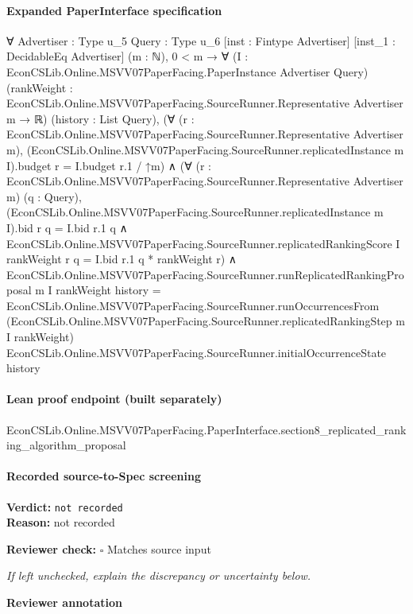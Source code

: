 \documentclass[10pt]{article}
\newcommand{\reviewerbox}{%
  \par\noindent\fbox{\parbox{0.96\linewidth}{\rule{0pt}{0.38in}}}\par
}
\newcommand{\reviewmatch}[1]{%
  \par\noindent\textbf{Reviewer check:} $\square$\; #1\par
  \noindent\emph{If left unchecked, explain the discrepancy or uncertainty below.}\par
}
\begin{document}
\paragraph{Expanded PaperInterface specification}
\begin{ReviewVerbatim}
∀ {Advertiser : Type u_5} {Query : Type u_6} [inst : Fintype Advertiser] [inst_1 : DecidableEq Advertiser] (m : ℕ),
  0 < m →
    ∀ (I : EconCSLib.Online.MSVV07PaperFacing.PaperInstance Advertiser Query)
      (rankWeight : EconCSLib.Online.MSVV07PaperFacing.SourceRunner.Representative Advertiser m → ℝ)
      (history : List Query),
      (∀ (r : EconCSLib.Online.MSVV07PaperFacing.SourceRunner.Representative Advertiser m),
          (EconCSLib.Online.MSVV07PaperFacing.SourceRunner.replicatedInstance m I).budget r = I.budget r.1 / ↑m) ∧
        (∀ (r : EconCSLib.Online.MSVV07PaperFacing.SourceRunner.Representative Advertiser m) (q : Query),
            (EconCSLib.Online.MSVV07PaperFacing.SourceRunner.replicatedInstance m I).bid r q = I.bid r.1 q ∧
              EconCSLib.Online.MSVV07PaperFacing.SourceRunner.replicatedRankingScore I rankWeight r q =
                I.bid r.1 q * rankWeight r) ∧
          EconCSLib.Online.MSVV07PaperFacing.SourceRunner.runReplicatedRankingProposal m I rankWeight history =
            EconCSLib.Online.MSVV07PaperFacing.SourceRunner.runOccurrencesFrom
              (EconCSLib.Online.MSVV07PaperFacing.SourceRunner.replicatedRankingStep m I rankWeight)
              EconCSLib.Online.MSVV07PaperFacing.SourceRunner.initialOccurrenceState history
\end{ReviewVerbatim}

\paragraph{Lean proof endpoint (built separately)}\begin{ReviewVerbatim}
EconCSLib.Online.MSVV07PaperFacing.PaperInterface.section8_replicated_ranking_algorithm_proposal
\end{ReviewVerbatim}

\paragraph{Recorded source-to-Spec screening}
\textbf{Verdict:} \texttt{not recorded}
\\
\textbf{Reason:} not recorded
\reviewmatch{Matches source input}
\noindent\textbf{Reviewer annotation}\par
\reviewerbox
\clearpage
\hypertarget{source-claim-21680fcf9feef3df}{}
\end{document}
